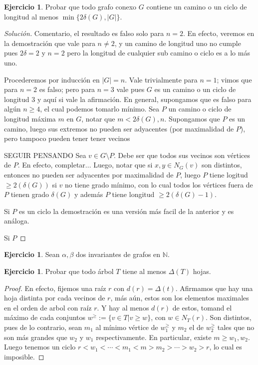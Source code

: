 \documentclass[12pt]{report}
\theoremstyle{plain}
\theoremstyle{definition}
\newtheorem{exercise}[theorem]{Ejercicio}
\newenvironment{solution}{\begin{proof}[Solución]}{\end{proof}}
\newcommand{\naturals}{\mathbb{N}}
\newcommand{\abs}[1]{\left \vert #1 \right \vert}
\begin{document}
\begin{exercise}
Probar que todo grafo conexo $G$ contiene un camino o un ciclo de longitud al menos $\min \{2 \delta (G) , \abs G\}$.
\end{exercise}
\begin{solution}
Comentario, el resultado es falso solo para $n = 2$. En efecto, veremos en la demostración que vale para $n \neq 2$,
y un camino de longitud uno no cumple pues $2 \delta = 2$ y $n = 2$ pero la longitud de cualquier sub camino o ciclo
es a lo más uno.

Procederemos por inducción en $\abs G = n$. Vale trivialmente para $n=1$; vimos que para $n=2$ es falso; pero para $n
=3$ vale pues $G$ es un camino o un ciclo de longitud $3$ y aquí si vale la afirmación. En general, supongamos que es
 falso para algún $n \geq 4$, el cual podemos tomarlo mínimo. Sea $P$ un camino o ciclo de longitud máxima $m$ en $G$, notar que $m < 2 \delta (G), n$. Supongamos que $P$ es un camino, luego sus extremos no pueden ser adyacentes (por maximalidad de $P$), pero tampoco pueden tener tener vecinos

SEGUIR PENSANDO
 Sea $v \in G \setminus P$. Debe ser que todos sus vecinos son vértices de $P$. En efecto, completar...
 Luego, notar que si $x,y \in N_G(v)$ son distintos, entonces no pueden ser adyacentes por maximalidad de $P$, luego $P$ tiene logitud $ \geq 2 (\delta(G))$ si $v$ no tiene grado mínimo, con lo cual todos los vértices fuera de $P$ tienen grado $\delta(G)$ y además $P$ tiene longitud $\geq 2 (\delta(G)-1)$.

 Si $P$ es un ciclo la demostración es una versión más facil de la anterior y es análoga.

 Si $P$



\end{solution}

\begin{exercise}
Sean $\alpha, \beta$ dos invariantes de grafos en $\naturals$.
\end{exercise}

\begin{exercise}
Probar que todo árbol $T$ tiene al menos $\Delta (T)$ hojas.
\end{exercise}
\begin{proof}
En efecto, fijemos una raíz $r$ con $d (r) = \Delta (t)$. Afirmamos que hay una hoja distinta por cada vecinos de $r$, más aún, estos son los elementos maximales en el orden de arbol con raíz $r$. Y hay al menos $d(r)$ de estos, tomand el máximo de cada conjuntos $w^{\geq} := \{ v \in T | v \geq w \}$, con $w \in N_T (r)$. Son distintos, pues de lo contrario, sean $m_1$ al mínimo vértice de $w_1^{\geq}$ y $m_2$ el de $w_2^{\geq}$ tales que no son más grandes que $w_2$ y $w_1$ respectivamente. En particular, existe $m \geq w_1,w_2$. Luego tenemos un ciclo $r <  w_1 < \cdots < m_1 < m > m_2 > \cdots > w_2 > r$, lo cual es imposible.
\end{proof}
\end{document}

